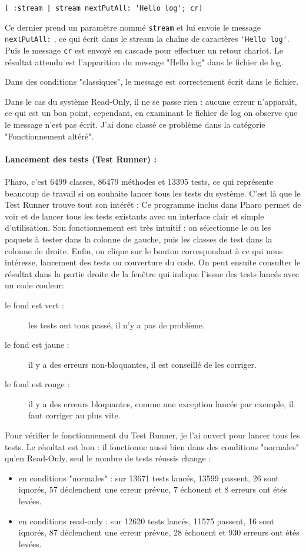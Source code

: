 \begin{verbatim}
[ :stream | stream nextPutAll: 'Hello log'; cr]
\end{verbatim}

Ce dernier prend un paramètre nommé \verb$stream$ et lui envoie le message \verb$nextPutAll:$ , ce qui écrit dans le stream la chaîne de caractères \verb$'Hello log'$. Puis le message \verb$cr$ est envoyé en cascade pour effectuer un retour chariot. Le résultat attendu est l'apparition du message "Hello log" dans le fichier de log.

Dans des conditions "classiques", le message est correctement écrit dans le fichier.

Dans le cas du système Read-Only, il ne se passe rien : aucune erreur n'apparaît, ce qui est un bon point, cependant, en examinant le fichier de log on observe que le message n'est pas écrit. J'ai donc classé ce problème dans la catégorie "Fonctionnement altéré".

\paragraph{Lancement des tests (Test Runner) :}
Pharo, c'est 6499 classes, 86479 méthodes et 13395 tests, ce qui représente beaucoup de travail si on souhaite lancer tous les tests du système. C'est là que le Test Runner trouve tout son intérêt : Ce programme inclus dans Pharo permet de voir et de lancer tous les tests existants avec un interface clair et simple d'utilisation. Son fonctionnement est très intuitif : on sélectionne le ou les paquets à tester dans la colonne de gauche, puis les classes de test dans la colonne de droite. Enfin, on clique sur le bouton correspondant à ce qui nous intéresse, lancement des tests ou couverture du code. On peut ensuite consulter le résultat dans la partie droite de la fenêtre qui indique l'issue des tests lancés avec un code couleur:
\begin{description}
	\item[le fond est vert :] les tests ont tous passé, il n'y a pas de problème.
	\item[le fond est jaune :] il y a des erreurs non-bloquantes, il est conseillé de les corriger.
	\item[le fond est rouge :] il y a des erreurs bloquantes, comme une exception lancée par exemple, il faut corriger au plus vite.
\end{description}

Pour vérifier le fonctionnement du Test Runner, je l'ai ouvert pour lancer tous les tests. Le résultat est bon : il fonctionne aussi bien dans des conditions "normales" qu'en Read-Only, seul le nombre de tests réussis change :
\begin{itemize}
	\item en conditions "normales" : sur 13671 tests lancés, 13599 passent, 26 sont iqnorés, 57 déclenchent une erreur prévue, 7 échouent et 8 erreurs ont étés levées.
	\item en conditions read-only : sur 12620 tests lancés, 11575 passent, 16 sont iqnorés, 87 déclenchent une erreur prévue, 28 échouent et 930 erreurs ont étés levées.
\end{itemize}

